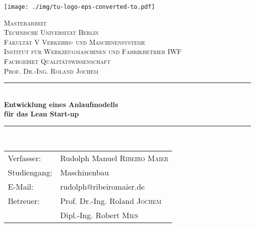\begin{titlepage}
\begin{flushright}
\texttt{[image: ./img/tu-logo-eps-converted-to.pdf]}\\[2.5cm] %
\end{flushright}

\newcommand{\HRule}{\rule{\linewidth}{0.5mm}} %

\center %
 

\textsc{\LARGE Masterarbeit}\\[1.5cm] %
\textsc{\Large Technische Universität Berlin\\Fakultät V  Verkehrs- und Maschinensysteme}\\[0.5cm] %
\textsc{\large Institut für Werkzeugmaschinen und Fabrikbetrieb IWF\\Fachgebiet Qualitätswissenschaft\\Prof. Dr.-Ing. Roland Jochem}\\[2.5cm] %


\HRule \\[0.6cm]
{ \huge \bfseries Entwicklung eines Anlaufmodells \\für das Lean Start-up}\\[0.4cm] %
\HRule \\[3cm]
 
\begin{tabular}{ll}
Verfasser: & Rudolph Manuel \textsc{Ribeiro Maier} \\
Studiengang: & Maschinenbau \\
E-Mail: & rudolph@ribeiromaier.de \\[1cm]
Betreuer: & Prof. Dr.-Ing. Roland \textsc{Jochem} \\
& Dipl.-Ing. Robert \textsc{Mies}
\end{tabular}\\[2cm]
 

\end{titlepage}
